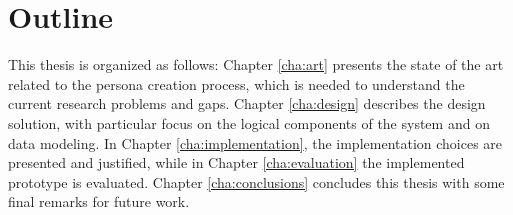 \section{Outline}
This thesis is organized as follows: Chapter \ref{cha:art} presents the state of the art related to the persona creation process, which is needed to understand the current research problems and gaps. Chapter \ref{cha:design} describes the design solution, with particular focus on the logical components of the system and on data modeling. In Chapter \ref{cha:implementation}, the implementation choices are presented and justified, while in Chapter \ref{cha:evaluation} the implemented prototype is evaluated. Chapter \ref{cha:conclusions} concludes this thesis with some final remarks for future work.
